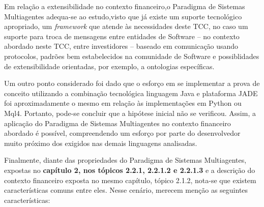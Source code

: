 Em relação a extensibilidade no contexto financeiro,o Paradigma de Sistemas Multiagentes adequa-se ao estudo,visto que já existe um suporte tecnológico apropriado, um \textit{framework} que atende às necessidades deste TCC, no caso um suporte para troca de mensagens entre entidades de Software – no contexto abordado neste TCC, entre investidores – baseado em comunicação usando protocolos, padrões bem estabelecidos na comunidade de Software e possiblidades de extensibilidade orientadas, por exemplo, a ontologias específicas.

Um outro ponto considerado foi dado que o esforço em se implementar a prova de conceito utilizando a combinação tecnológica linguagem Java e plataforma JADE foi aproximadamente o mesmo em relação às implementações em Python ou Mql4. Portanto, pode-se concluir que a hipótese inicial não se verificou. Assim, a aplicação do Paradigma de Sistemas Multiagentes no contexto financeiro abordado é possível, compreendendo um esforço por parte do desenvolvedor muito próximo dos exigidos nas demais linguagens analisadas.

Finalmente, diante das propriedades do Paradigma de Sistemas Multiagentes, expostas no \textbf{capítulo 2, nos tópicos 2.2.1, 2.2.1.2 e 2.2.1.3} e a descrição do contexto financeiro exposta no mesmo capítulo, tópico 2.1.2, nota-se que existem características comuns entre eles. Nesse cenário, merecem menção as seguintes características:


